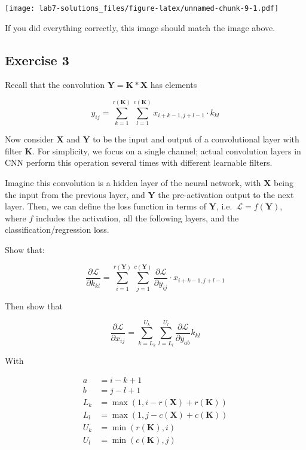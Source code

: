\documentclass[
  a4paper,
]{article}
\begin{document}
\texttt{[image: lab7-solutions\_files/figure-latex/unnamed-chunk-9-1.pdf]}

If you did everything correctly, this image should match the image
above.

\hypertarget{exercise-3}{%
\subsection{Exercise 3}\label{exercise-3}}

Recall that the convolution \(\textbf{Y}=\textbf{K}*\textbf{X}\) has
elements

\begin{equation}
y_{ij}=\sum_{k=1}^{r(\textbf{K})}\sum_{l=1}^{c(\textbf{K})}x_{i+k-1,j+l-1}\cdot k_{kl}
\end{equation}

Now consider \(\textbf{X}\) and \(\textbf{Y}\) to be the input and
output of a convolutional layer with filter \(\textbf{K}\). For
simplicity, we focus on a single channel; actual convolution layers in
CNN perform this operation several times with different learnable
filters.

Imagine this convolution is a hidden layer of the neural network, with
\(\textbf{X}\) being the input from the previous layer, and
\(\textbf{Y}\) the pre-activation output to the next layer. Then, we can
define the loss function in terms of \(\textbf{Y}\),
i.e.~\(\mathcal{L}=f(\textbf{Y})\), where \(f\) includes the activation,
all the following layers, and the classification/regression loss.

Show that:

\begin{equation}
\frac{\partial\mathcal{L}}{\partial k_{kl}}=\sum_{i=1}^{r(\textbf{Y})}\sum_{j=1}^{c(\textbf{Y})}\frac{\partial\mathcal{L}}{\partial y_{ij}}\cdot x_{i+k-1,j+l-1}
\end{equation}

Then show that

\begin{equation}
\frac{\partial\mathcal{L}}{\partial x_{ij}}=\sum_{k=L_k}^{U_k}\sum_{l=L_l}^{U_l}\frac{\partial\mathcal{L}}{\partial y_{ab}}k_{kl}
\end{equation}

With

\begin{align}
a &= i-k+1 \\
b &= j-l+1 \\
L_k &= \max(1, i - r(\textbf{X}) + r(\textbf{K})) \\
L_l &= \max(1, j - c(\textbf{X}) + c(\textbf{K})) \\
U_k &= \min(r(\textbf{K}), i) \\
U_l &= \min(c(\textbf{K}), j)
\end{align}
\end{document}
